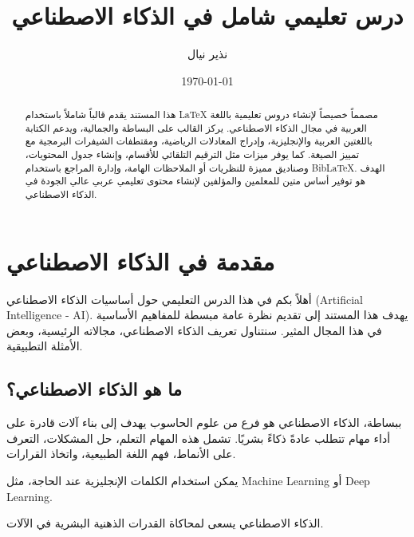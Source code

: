 \documentclass[12pt, a4paper]{article}
\title{درس تعليمي شامل في الذكاء الاصطناعي}
\author{نذير نيال}
\date{\today}
\begin{document}
\maketitle %

\begin{abstract}
\noindent %
هذا المستند يقدم قالباً شاملاً باستخدام \textenglish{LaTeX} مصمماً خصيصاً لإنشاء دروس تعليمية باللغة العربية في مجال الذكاء الاصطناعي. يركز القالب على البساطة والجمالية، ويدعم الكتابة باللغتين العربية والإنجليزية، وإدراج المعادلات الرياضية، ومقتطفات الشيفرات البرمجية مع تمييز الصيغة. كما يوفر ميزات مثل الترقيم التلقائي للأقسام، وإنشاء جدول المحتويات، وصناديق مميزة للنظريات أو الملاحظات الهامة، وإدارة المراجع باستخدام \textenglish{BibLaTeX}. الهدف هو توفير أساس متين للمعلمين والمؤلفين لإنشاء محتوى تعليمي عربي عالي الجودة في الذكاء الاصطناعي.
\end{abstract}

\newpage
\tableofcontents %
\newpage


\section{مقدمة في الذكاء الاصطناعي}

أهلاً بكم في هذا الدرس التعليمي حول أساسيات الذكاء الاصطناعي (\textenglish{Artificial Intelligence - AI}). يهدف هذا المستند إلى تقديم نظرة عامة مبسطة للمفاهيم الأساسية في هذا المجال المثير. سنتناول تعريف الذكاء الاصطناعي، مجالاته الرئيسية، وبعض الأمثلة التطبيقية.

\subsection{ما هو الذكاء الاصطناعي؟}

ببساطة، الذكاء الاصطناعي هو فرع من علوم الحاسوب يهدف إلى بناء آلات قادرة على أداء مهام تتطلب عادةً ذكاءً بشريًا. تشمل هذه المهام التعلم، حل المشكلات، التعرف على الأنماط، فهم اللغة الطبيعية، واتخاذ القرارات.

يمكن استخدام الكلمات الإنجليزية عند الحاجة، مثل \textenglish{Machine Learning} أو \textenglish{Deep Learning}.

\begin{highlightbox}
الذكاء الاصطناعي يسعى لمحاكاة القدرات الذهنية البشرية في الآلات.
\end{highlightbox}
\end{document}
